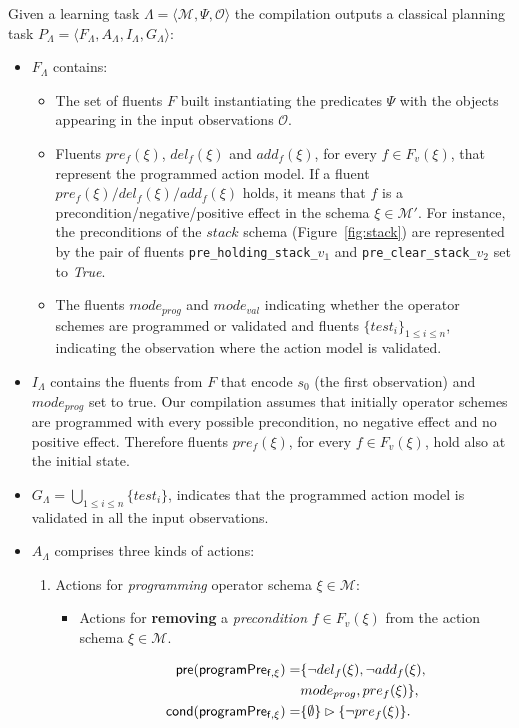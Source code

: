 \documentclass{article}
\newcommand{\tup}[1]{{\langle #1 \rangle}}
\newcommand{\pre}{\mathsf{pre}}     %
\newcommand{\cond}{\mathsf{cond}}   %
\begin{document}
Given a learning task $\Lambda=\tup{\mathcal{M},\Psi,\mathcal{O}}$ the compilation outputs a classical planning task $P_{\Lambda}=\tup{F_{\Lambda},A_{\Lambda},I_{\Lambda},G_{\Lambda}}$:
\begin{itemize}
\item $F_{\Lambda}$ contains:
\begin{itemize}
\item The set of fluents $F$ built instantiating the predicates $\Psi$ with the objects appearing in the input observations $\mathcal{O}$.
\item Fluents $pre_f(\xi)$, $del_f(\xi)$ and $add_f(\xi)$, for every $f\in F_v(\xi)$, that represent the programmed action model. If a fluent $pre_f(\xi)/del_f(\xi)/add_f(\xi)$ holds, it means that $f$ is a precondition/negative/positive effect in the schema $\xi\in \mathcal{M}'$. For instance, the preconditions of the $stack$ schema (Figure~\ref{fig:stack}) are represented by the pair of fluents {\small\tt pre\_holding\_stack\_$v_1$} and {\small\tt pre\_clear\_stack\_$v_2$} set to {\em True}.
\item The fluents $mode_{prog}$ and $mode_{val}$ indicating whether the operator schemes are programmed or validated and fluents $\{test_i\}_{1\leq i\leq n}$, indicating the observation where the action model is validated.
\end{itemize}
\item $I_{\Lambda}$ contains the fluents from $F$ that encode $s_0$ (the first observation) and $mode_{prog}$ set to true. Our compilation assumes that initially operator schemes are programmed with every possible precondition, no negative effect and no positive effect. Therefore fluents $pre_f(\xi)$, for every $f\in F_v(\xi)$, hold also at the initial state.
\item $G_{\Lambda}=\bigcup_{1\leq i\leq n}\{test_i\}$, indicates that the programmed action model is validated in all the input observations.
\item $A_{\Lambda}$ comprises three kinds of actions:
\begin{enumerate}
\item Actions for {\em programming} operator schema $\xi\in\mathcal{M}$:
\begin{itemize}
\item Actions for {\bf removing} a {\em precondition} $f\in F_v(\xi)$ from the action schema $\xi\in\mathcal{M}$.

\begin{small}
\begin{align*}
\hspace*{7pt}\pre(\mathsf{programPre_{f,\xi}})=&\{\neg del_{f}(\xi),\neg add_{f}(\xi),\\
& mode_{prog}, pre_{f}(\xi)\},\\
\cond(\mathsf{programPre_{f,\xi}})=&\{\emptyset\}\rhd\{\neg pre_{f}(\xi)\}.
\end{align*}
\end{small}


\end{itemize}
\end{enumerate}
\end{itemize}
\end{document}

